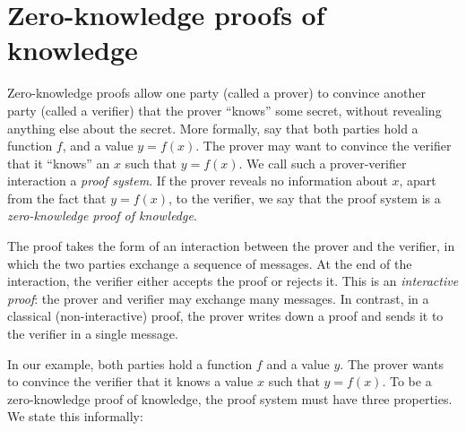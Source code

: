 \documentclass[
  letterpaper,
]{scrbook}
\theoremstyle{definition}
\theoremstyle{plain}
\theoremstyle{plain}
\theoremstyle{remark}
\begin{document}
\section{Zero-knowledge proofs of knowledge}\label{sec-zkdefn}

Zero-knowledge proofs allow one party (called a prover) to convince
another party (called a verifier) that the prover ``knows'' some secret,
without revealing anything else about the secret. More formally, say
that both parties hold a function \(f\), and a value \(y = f(x)\). The
prover may want to convince the verifier that it ``knows'' an \(x\) such
that \(y=f(x)\). We call such a prover-verifier interaction a
\emph{proof system}. If the prover reveals no information about \(x\),
apart from the fact that \(y=f(x)\), to the verifier, we say that the
proof system is a \emph{zero-knowledge proof of knowledge}.

The proof takes the form of an interaction between the prover and the
verifier, in which the two parties exchange a sequence of messages. At
the end of the interaction, the verifier either accepts the proof or
rejects it. This is an \emph{interactive proof}: the prover and verifier
may exchange many messages. In contrast, in a classical
(non-interactive) proof, the prover writes down a proof and sends it to
the verifier in a single message.


In our example, both parties hold a function \(f\) and a value \(y\).
The prover wants to convince the verifier that it knows a value \(x\)
such that \(y=f(x)\). To be a zero-knowledge proof of knowledge, the
proof system must have three properties. We state this informally:

\end{document}
